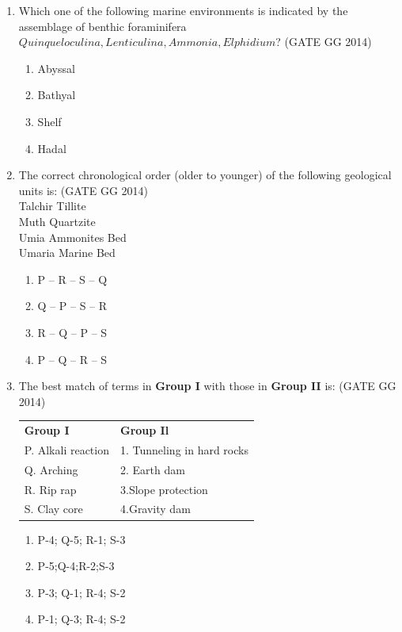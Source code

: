 \documentclass[journal]{IEEEtran}
\begin{document}
\begin{enumerate}[start=1]
\item Which one of the following marine environments is indicated by the assemblage of benthic foraminifera $Quinqueloculina, Lenticulina, Ammonia, Elphidium$?
\hfill(GATE GG 2014)
\begin{multicols}{2}
\begin{enumerate}
    \item Abyssal
    \item Bathyal
    \item Shelf
    \item Hadal
\end{enumerate}
\end{multicols}

\item The correct chronological order (older to younger) of the following geological units is:
\hfill(GATE GG 2014)\\
 Talchir Tillite\\
Muth Quartzite\\
Umia Ammonites Bed\\
 Umaria Marine Bed\\

\begin{enumerate}
    \item P -- R -- S -- Q
    \item Q -- P -- S -- R
    \item R -- Q -- P -- S
    \item P -- Q -- R -- S
\end{enumerate}

\item The best match of terms in \textbf{Group I} with those in \textbf{Group II} is:
\hfill{(GATE GG 2014)}\\
\begin{tabular}{ l l }
\textbf{Group I} & \textbf{Group Il}\\
P. Alkali reaction & 1. Tunneling in hard rocks\\
Q. Arching & 2. Earth dam\\
R. Rip rap & 3.Slope protection\\ 
S. Clay core & 4.Gravity dam\\
\end{tabular}
\begin{multicols}{2}
\begin{enumerate}
    \item P-4; Q-5; R-1; S-3
     \item P-5;Q-4;R-2;S-3
     \item P-3; Q-1; R-4; S-2
     \item P-1; Q-3; R-4; S-2
\end{enumerate}
\end{multicols}


\end{enumerate}
\end{document}
